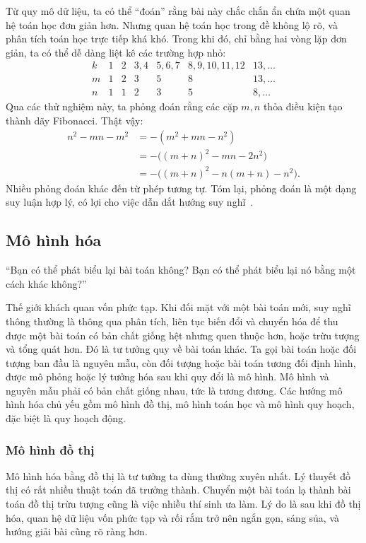 \documentclass[11pt]{article}
\begin{document}
Từ quy mô dữ liệu, ta có thể ``đoán'' rằng bài này chắc chắn ẩn chứa một quan
hệ toán học đơn giản hơn. Nhưng quan hệ toán học trong đề không lộ rõ, và phân
tích toán học trực tiếp khá khó. Trong khi đó, chỉ bằng hai vòng lặp đơn giản,
ta có thể dễ dàng liệt kê các trường hợp nhỏ:
\[
\begin{array}{c|cccccc}
k & 1 & 2 & 3,4 & 5,6,7 & 8,9,10,11,12 & 13,\ldots\\
\hline
m & 1 & 2 & 3 & 5 & 8 & 13,\ldots\\
n & 1 & 1 & 2 & 3 & 5 & 8,\ldots
\end{array}
\]
Qua các thử nghiệm này, ta phỏng đoán rằng các cặp \(m,n\) thỏa điều kiện tạo
thành dãy Fibonacci. Thật vậy:
\[
\begin{aligned}
n^2-mn-m^2
  &=-(m^2+mn-n^2)\\
  &=-\bigl((m+n)^2-mn-2n^2\bigr)\\
  &=-\bigl((m+n)^2-n(m+n)-n^2\bigr).
\end{aligned}
\]
Nhiều phỏng đoán khác đến từ phép tương tự. Tóm lại, phỏng đoán là một dạng
suy luận hợp lý, có lợi cho việc dẫn dắt hướng suy nghĩ~\cite{math-thinking}.

\subsection{Mô hình hóa}

``Bạn có thể phát biểu lại bài toán không? Bạn có thể phát biểu lại nó bằng
một cách khác không?''

Thế giới khách quan vốn phức tạp. Khi đối mặt với một bài toán mới, suy nghĩ
thông thường là thông qua phân tích, liên tục biến đổi và chuyển hóa để thu
được một bài toán có bản chất giống hệt nhưng quen thuộc hơn, hoặc trừu tượng
và tổng quát hơn. Đó là tư tưởng quy về bài toán khác. Ta gọi bài toán hoặc
đối tượng ban đầu là nguyên mẫu, còn đối tượng hoặc bài toán tương đối định
hình, được mô phỏng hoặc lý tưởng hóa sau khi quy đổi là mô hình. Mô hình và
nguyên mẫu phải có bản chất giống nhau, tức là tương đương. Các hướng mô hình
hóa chủ yếu gồm mô hình đồ thị, mô hình toán học và mô hình quy hoạch, đặc
biệt là quy hoạch động.

\subsubsection{Mô hình đồ thị}

Mô hình hóa bằng đồ thị là tư tưởng ta dùng thường xuyên nhất. Lý thuyết đồ
thị có rất nhiều thuật toán đã trưởng thành. Chuyển một bài toán lạ thành bài
toán đồ thị trừu tượng cũng là việc nhiều thí sinh ưa làm. Lý do là sau khi
đồ thị hóa, quan hệ dữ liệu vốn phức tạp và rối rắm trở nên ngắn gọn, sáng
sủa, và hướng giải bài cũng rõ ràng hơn.
\end{document}

